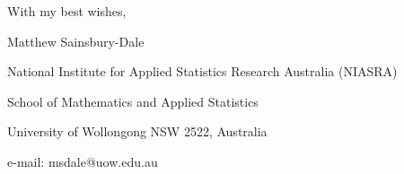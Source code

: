 \documentclass[english]{letter}
\begin{document}







 With my best wishes,

 \vspace{0.2in}

Matthew Sainsbury-Dale

\vspace{-0.1in}

National Institute for Applied Statistics Research Australia (NIASRA)

\vspace{-0.1in}

School of Mathematics and Applied Statistics

\vspace{-0.1in}

University of Wollongong NSW 2522, Australia

\vspace{-0.1in}

e-mail: msdale@uow.edu.au
\end{document}
